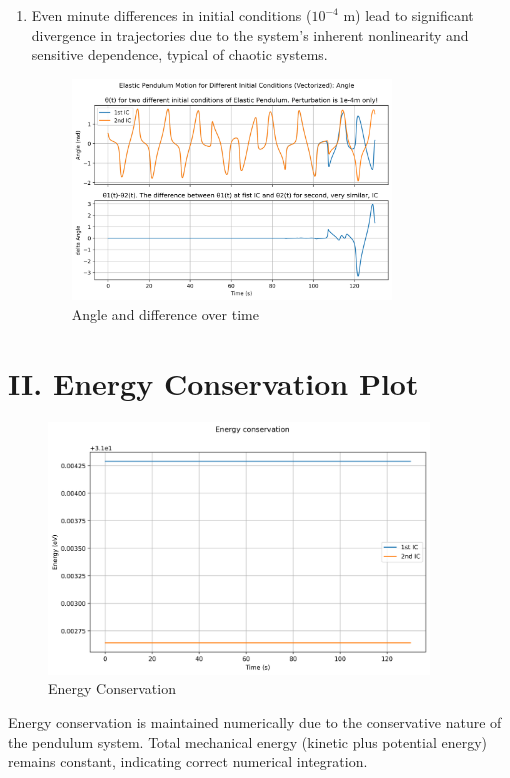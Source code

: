 \documentclass{article}
\begin{document}
\begin{enumerate}
		\item Even minute differences in initial conditions ($10^{-4}$ m) lead to significant divergence in trajectories due to the system's inherent nonlinearity and sensitive dependence, typical of chaotic systems.
			\begin{figure}[h!]
				\centering
				\includegraphics[width=0.8\textwidth]{elastic_pendulum_theta.png}
				\caption{Angle and difference over time}
		\end{figure}
	\end{enumerate}
	
	\section*{II. Energy Conservation Plot}
	
	\begin{figure}[h!]
		\centering
		\includegraphics[width=0.9\textwidth]{energy.png}
		\caption{Energy Conservation}
	\end{figure}
	
	Energy conservation is maintained numerically due to the conservative nature of the pendulum system. Total mechanical energy (kinetic plus potential energy) remains constant, indicating correct numerical integration.
	
\end{document}

